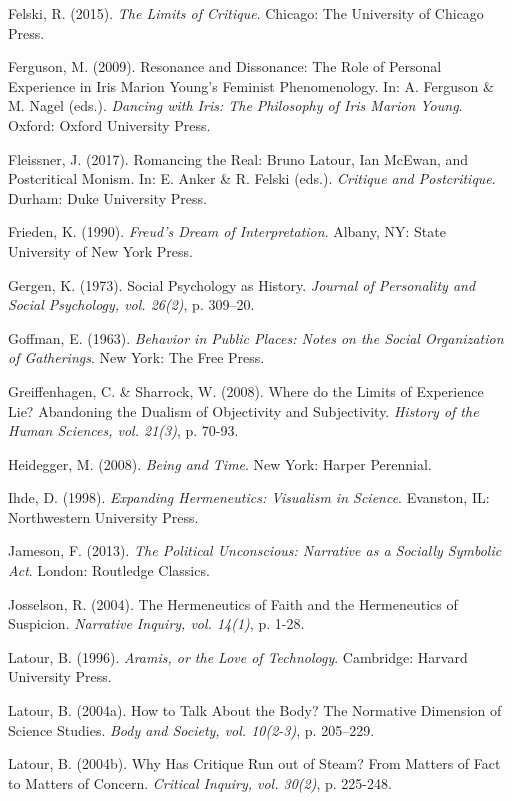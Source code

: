\begin{thebibliography}{99}
\item Felski, R. (2015). \textit{The Limits of Critique}. Chicago: The University of Chicago Press.
\item Ferguson, M. (2009). Resonance and Dissonance: The Role of Personal Experience in Iris Marion Young’s Feminist Phenomenology. In: A. Ferguson \& M. Nagel (eds.). \textit{Dancing with Iris: The Philosophy of Iris Marion Young}. Oxford: Oxford University Press.
\item Fleissner, J. (2017). Romancing the Real: Bruno Latour, Ian McEwan, and Postcritical Monism. In: E. Anker \& R. Felski (eds.). \textit{Critique and Postcritique}. Durham: Duke University Press.
\item Frieden, K. (1990). \textit{Freud’s Dream of Interpretation}. Albany, NY: State University of New York Press.
\item Gergen, K. (1973). Social Psychology as History. \textit{Journal of Personality and Social Psychology, vol. 26(2)}, p. 309–20.
\item Goffman, E. (1963). \textit{Behavior in Public Places: Notes on the Social Organization of Gatherings}. New York: The Free Press.
\item Greiffenhagen, C. \& Sharrock, W. (2008). Where do the Limits of Experience Lie? Abandoning the Dualism of Objectivity and Subjectivity. \textit{History of the Human Sciences, vol. 21(3)}, p. 70-93.
\item Heidegger, M. (2008). \textit{Being and Time}. New York: Harper Perennial.
\item Ihde, D. (1998). \textit{Expanding Hermeneutics: Visualism in Science}. Evanston, IL: Northwestern University Press.
\item Jameson, F. (2013). \textit{The Political Unconscious: Narrative as a Socially Symbolic} \textit{Act}. London: Routledge Classics.
\item Josselson, R. (2004). The Hermeneutics of Faith and the Hermeneutics of Suspicion. \textit{Narrative Inquiry, vol. 14(1)}, p. 1-28.
\item Latour, B. (1996). \textit{Aramis, or the Love of Technology}. Cambridge: Harvard University Press.
\item Latour, B. (2004a). How to Talk About the Body? The Normative Dimension of Science Studies. \textit{Body and Society, vol. 10(2-3)}, p. 205–229.
\item Latour, B. (2004b). Why Has Critique Run out of Steam? From Matters of Fact to Matters of Concern. \textit{Critical Inquiry, vol. 30(2)}, p. 225-248.

\end{thebibliography}
